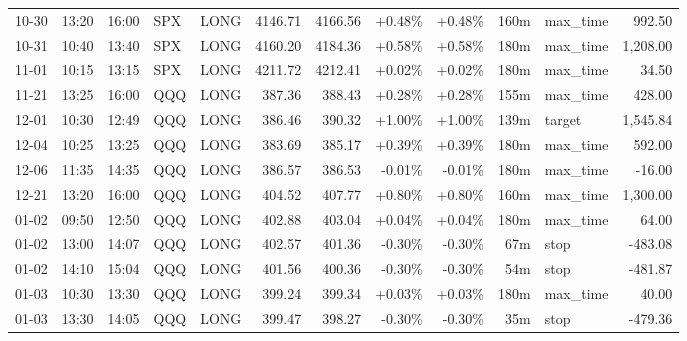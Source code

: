 \documentclass[11pt,a4paper,twoside]{article}
\begin{document}
\begin{center}
\begin{longtable}{>{\color{txtmain}}l l l l l r r r r r >{\color{txtmain}}l r}
10-30 & 13:20 & 16:00 & SPX & LONG & 4146.71 & 4166.56 & \textcolor{wingreen}{+0.48\%} & \textcolor{wingreen}{+0.48\%} & 160m & max\_time & \textcolor{wingreen}{992.50} \\
10-31 & 10:40 & 13:40 & SPX & LONG & 4160.20 & 4184.36 & \textcolor{wingreen}{+0.58\%} & \textcolor{wingreen}{+0.58\%} & 180m & max\_time & \textcolor{wingreen}{1,208.00} \\
11-01 & 10:15 & 13:15 & SPX & LONG & 4211.72 & 4212.41 & \textcolor{wingreen}{+0.02\%} & \textcolor{wingreen}{+0.02\%} & 180m & max\_time & \textcolor{wingreen}{34.50} \\
11-21 & 13:25 & 16:00 & QQQ & LONG & 387.36 & 388.43 & \textcolor{wingreen}{+0.28\%} & \textcolor{wingreen}{+0.28\%} & 155m & max\_time & \textcolor{wingreen}{428.00} \\
12-01 & 10:30 & 12:49 & QQQ & LONG & 386.46 & 390.32 & \textcolor{wingreen}{+1.00\%} & \textcolor{wingreen}{+1.00\%} & 139m & target & \textcolor{wingreen}{1,545.84} \\
12-04 & 10:25 & 13:25 & QQQ & LONG & 383.69 & 385.17 & \textcolor{wingreen}{+0.39\%} & \textcolor{wingreen}{+0.39\%} & 180m & max\_time & \textcolor{wingreen}{592.00} \\
12-06 & 11:35 & 14:35 & QQQ & LONG & 386.57 & 386.53 & \textcolor{lossred}{-0.01\%} & \textcolor{lossred}{-0.01\%} & 180m & max\_time & \textcolor{lossred}{-16.00} \\
12-21 & 13:20 & 16:00 & QQQ & LONG & 404.52 & 407.77 & \textcolor{wingreen}{+0.80\%} & \textcolor{wingreen}{+0.80\%} & 160m & max\_time & \textcolor{wingreen}{1,300.00} \\
01-02 & 09:50 & 12:50 & QQQ & LONG & 402.88 & 403.04 & \textcolor{wingreen}{+0.04\%} & \textcolor{wingreen}{+0.04\%} & 180m & max\_time & \textcolor{wingreen}{64.00} \\
01-02 & 13:00 & 14:07 & QQQ & LONG & 402.57 & 401.36 & \textcolor{lossred}{-0.30\%} & \textcolor{lossred}{-0.30\%} & 67m & stop & \textcolor{lossred}{-483.08} \\
01-02 & 14:10 & 15:04 & QQQ & LONG & 401.56 & 400.36 & \textcolor{lossred}{-0.30\%} & \textcolor{lossred}{-0.30\%} & 54m & stop & \textcolor{lossred}{-481.87} \\
01-03 & 10:30 & 13:30 & QQQ & LONG & 399.24 & 399.34 & \textcolor{wingreen}{+0.03\%} & \textcolor{wingreen}{+0.03\%} & 180m & max\_time & \textcolor{wingreen}{40.00} \\
01-03 & 13:30 & 14:05 & QQQ & LONG & 399.47 & 398.27 & \textcolor{lossred}{-0.30\%} & \textcolor{lossred}{-0.30\%} & 35m & stop & \textcolor{lossred}{-479.36} \\

\end{longtable}
\end{center}
\end{document}
